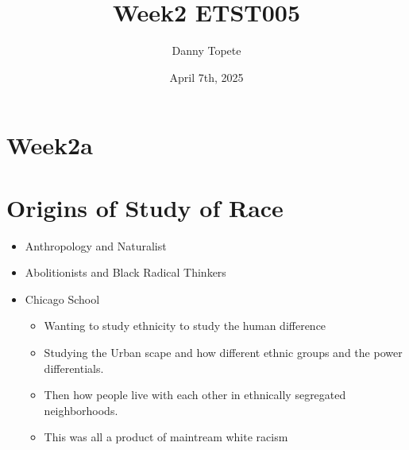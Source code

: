 \documentclass{article}
\title{Week2 ETST005}
\author{Danny Topete}
\date{April 7th, 2025}
\begin{document}
\maketitle

\section*{Week2a}

\section{Origins of Study of Race}
\begin{itemize}
  \item Anthropology and Naturalist
  \item Abolitionists and Black Radical Thinkers
  \item Chicago School
    \begin{itemize}
      \item Wanting to study ethnicity to study the human difference
      \item Studying the Urban scape and how 
        different ethnic groups and the power
        differentials.
      \item Then how people live with each other in ethnically 
        segregated neighborhoods.
      \item This was all a product of maintream white racism
    \end{itemize}
\end{itemize}
\end{document}
